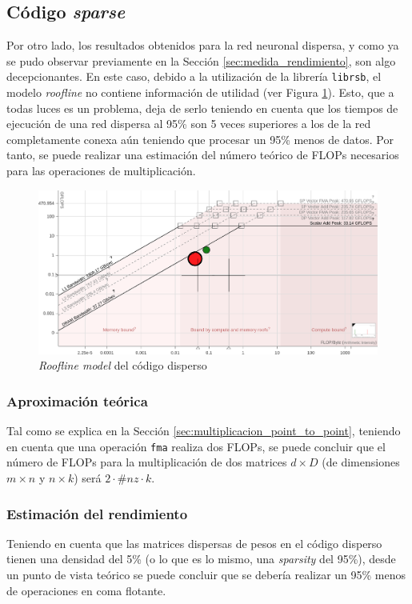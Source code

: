 \subsection{Código \textit{sparse}}
\label{ssec:codigo_sparse_perfilado}
Por otro lado, los resultados obtenidos para la red neuronal dispersa, y como ya se pudo observar previamente en la Sección \ref{sec:medida_rendimiento}, son algo decepcionantes. En este caso, debido a la utilización de la librería \texttt{librsb}, el modelo \textit{roofline} no contiene información de utilidad (ver Figura \ref{fig:roofline_sparse_details}). Esto, que a todas luces es un problema, deja de serlo teniendo en cuenta que los tiempos de ejecución de una red dispersa al 95\% son 5 veces superiores a los de la red completamente conexa aún teniendo que procesar un 95\% menos de datos. Por tanto, se puede realizar una estimación del número teórico de FLOPs necesarios para las operaciones de multiplicación.

\begin{figure}[h!]
    \centering
    \includegraphics[width=\textwidth]{img/rooflines/roofline_sparse.png}
    \caption{\textit{Roofline model} del código disperso}
    \label{fig:roofline_sparse_details}
\end{figure}

\subsubsection{Aproximación teórica}
Tal como se explica en la Sección \ref{sec:multiplicacion_point_to_point}, teniendo en cuenta que una operación \texttt{\acrshort{fma}} realiza dos FLOPs, se puede concluir que el número de FLOPs para la multiplicación de dos matrices $d\times D$ (de dimensiones $m \times n$ y $n \times k$) será $2 \cdot \#nz \cdot k$.

\subsubsection{Estimación del rendimiento}
Teniendo en cuenta que las matrices dispersas de pesos en el código disperso tienen una densidad del 5\% (o lo que es lo mismo, una \textit{sparsity} del 95\%), desde un punto de vista teórico se puede concluir que se debería realizar un 95\% menos de operaciones en coma flotante.

